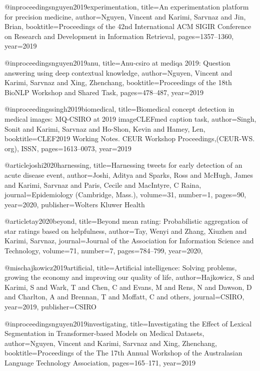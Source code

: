@inproceedings{nguyen2019experimentation,
  title={An experimentation platform for precision medicine},
  author={Nguyen, Vincent and Karimi, Sarvnaz and Jin, Brian},
  booktitle={Proceedings of the 42nd International ACM SIGIR Conference on Research and Development in Information Retrieval},
  pages={1357--1360},
  year={2019}
}

@inproceedings{nguyen2019anu,
  title={Anu-csiro at mediqa 2019: Question answering using deep contextual knowledge},
  author={Nguyen, Vincent and Karimi, Sarvnaz and Xing, Zhenchang},
  booktitle={Proceedings of the 18th BioNLP Workshop and Shared Task},
  pages={478--487},
  year={2019}
}

@inproceedings{singh2019biomedical,
  title={Biomedical concept detection in medical images: MQ-CSIRO at 2019 imageCLEFmed caption task},
  author={Singh, Sonit and Karimi, Sarvnaz and Ho-Shon, Kevin and Hamey, Len},
  booktitle={CLEF2019 Working Notes. CEUR Workshop Proceedings,(CEUR-WS. org), ISSN},
  pages={1613--0073},
  year={2019}
}

@article{joshi2020harnessing,
  title={Harnessing tweets for early detection of an acute disease event},
  author={Joshi, Aditya and Sparks, Ross and McHugh, James and Karimi, Sarvnaz and Paris, Cecile and MacIntyre, C Raina},
  journal={Epidemiology (Cambridge, Mass.)},
  volume={31},
  number={1},
  pages={90},
  year={2020},
  publisher={Wolters Kluwer Health}
}

@article{tay2020beyond,
  title={Beyond mean rating: Probabilistic aggregation of star ratings based on helpfulness},
  author={Tay, Wenyi and Zhang, Xiuzhen and Karimi, Sarvnaz},
  journal={Journal of the Association for Information Science and Technology},
  volume={71},
  number={7},
  pages={784--799},
  year={2020},
}

@misc{hajkowicz2019artificial,
  title={Artificial intelligence: Solving problems, growing the economy and improving our quality of life},
  author={Hajkowicz, S and Karimi, S and Wark, T and Chen, C and Evans, M and Rens, N and Dawson, D and Charlton, A and Brennan, T and Moffatt, C and others},
  journal={CSIRO},
  year={2019},
  publisher={CSIRO}
}

@inproceedings{nguyen2019investigating,
  title={Investigating the Effect of Lexical Segmentation in Transformer-based Models on Medical Datasets},
  author={Nguyen, Vincent and Karimi, Sarvnaz and Xing, Zhenchang},
  booktitle={Proceedings of the The 17th Annual Workshop of the Australasian Language Technology Association},
  pages={165--171},
  year={2019}
}

